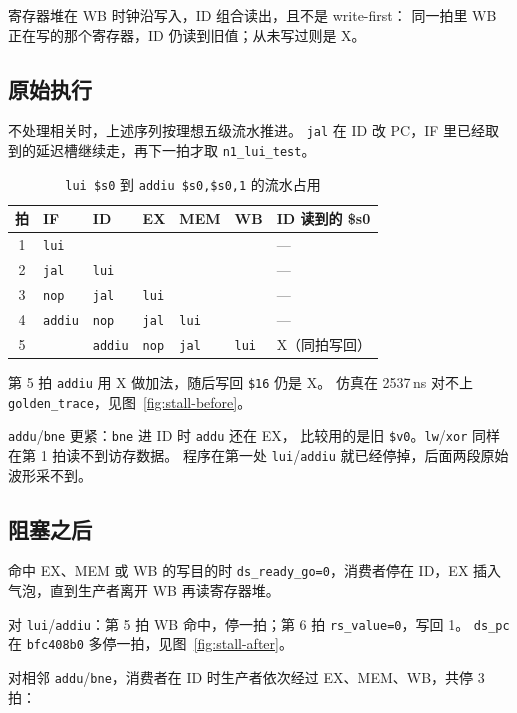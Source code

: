 \documentclass{article}
\begin{document}
寄存器堆在 WB 时钟沿写入，ID 组合读出，且不是 write-first：
同一拍里 WB 正在写的那个寄存器，ID 仍读到旧值；从未写过则是 X。

\subsection{原始执行}
不处理相关时，上述序列按理想五级流水推进。
\texttt{jal} 在 ID 改 PC，IF 里已经取到的延迟槽继续走，再下一拍才取 \texttt{n1\_lui\_test}。

\begin{table}[H]
  \centering
  \caption{\texttt{lui \$s0} 到 \texttt{addiu \$s0,\$s0,1} 的流水占用}
  \small
  \begin{tabular}{cllllll}
    \toprule
    拍 & IF & ID & EX & MEM & WB & ID 读到的 \$s0 \\
    \midrule
    1 & \texttt{lui} & & & & & --- \\
    2 & \texttt{jal} & \texttt{lui} & & & & --- \\
    3 & \texttt{nop} & \texttt{jal} & \texttt{lui} & & & --- \\
    4 & \texttt{addiu} & \texttt{nop} & \texttt{jal} & \texttt{lui} & & --- \\
    5 &  & \texttt{addiu} & \texttt{nop} & \texttt{jal} & \texttt{lui} & X（同拍写回） \\
    \bottomrule
  \end{tabular}
\end{table}

第 5 拍 \texttt{addiu} 用 X 做加法，随后写回 \texttt{\$16} 仍是 X。
仿真在 2537\,ns 对不上 \texttt{golden\_trace}，见图~\ref{fig:stall-before}。

\texttt{addu}/\texttt{bne} 更紧：\texttt{bne} 进 ID 时 \texttt{addu} 还在 EX，
比较用的是旧 \texttt{\$v0}。\texttt{lw}/\texttt{xor} 同样在第 1 拍读不到访存数据。
程序在第一处 \texttt{lui}/\texttt{addiu} 就已经停掉，后面两段原始波形采不到。

\subsection{阻塞之后}
命中 EX、MEM 或 WB 的写目的时 \texttt{ds\_ready\_go=0}，消费者停在 ID，EX 插入气泡，直到生产者离开 WB 再读寄存器堆。

对 \texttt{lui}/\texttt{addiu}：第 5 拍 WB 命中，停一拍；第 6 拍 \texttt{rs\_value=0}，写回 1。
\texttt{ds\_pc} 在 \texttt{bfc408b0} 多停一拍，见图~\ref{fig:stall-after}。

对相邻 \texttt{addu}/\texttt{bne}，消费者在 ID 时生产者依次经过 EX、MEM、WB，共停 3 拍：
\end{document}
